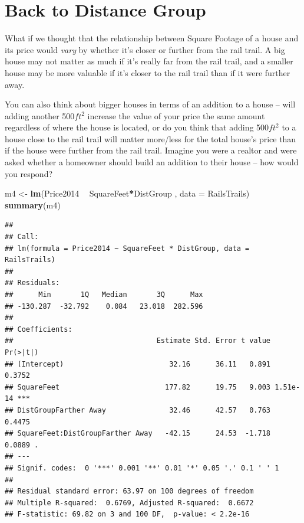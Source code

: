 \documentclass[]{article}
\newenvironment{Shaded}{\begin{snugshade}}{\end{snugshade}}
\newcommand{\DataTypeTok}[1]{\textcolor[rgb]{0.13,0.29,0.53}{#1}}
\newcommand{\KeywordTok}[1]{\textcolor[rgb]{0.13,0.29,0.53}{\textbf{#1}}}
\newcommand{\NormalTok}[1]{#1}
\newcommand{\OperatorTok}[1]{\textcolor[rgb]{0.81,0.36,0.00}{\textbf{#1}}}
\newcommand{\StringTok}[1]{\textcolor[rgb]{0.31,0.60,0.02}{#1}}
\begin{document}
\newpage

\hypertarget{back-to-distance-group}{%
\section{Back to Distance Group}\label{back-to-distance-group}}

What if we thought that the relationship between Square Footage of a
house and its price would \emph{vary} by whether it's closer or further
from the rail trail. A big house may not matter as much if it's really
far from the rail trail, and a smaller house may be more valuable if
it's closer to the rail trail than if it were further away.

You can also think about bigger houses in terms of an addition to a
house -- will adding another 500\(ft^2\) increase the value of your
price the same amount regardless of where the house is located, or do
you think that adding 500\(ft^2\) to a house close to the rail trail
will matter more/less for the total house's price than if the house were
further from the rail trail. Imagine you were a realtor and were asked
whether a homeowner should build an addition to their house -- how would
you respond?

\begin{Shaded}
\begin{Highlighting}[]
\NormalTok{m4 <-}\StringTok{ }\KeywordTok{lm}\NormalTok{(Price2014 }\OperatorTok{~}\StringTok{ }\NormalTok{SquareFeet}\OperatorTok{*}\NormalTok{DistGroup , }\DataTypeTok{data =}\NormalTok{ RailsTrails)}
\KeywordTok{summary}\NormalTok{(m4)}
\end{Highlighting}
\end{Shaded}

\begin{verbatim}
## 
## Call:
## lm(formula = Price2014 ~ SquareFeet * DistGroup, data = RailsTrails)
## 
## Residuals:
##      Min       1Q   Median       3Q      Max 
## -130.287  -32.792    0.084   23.018  282.596 
## 
## Coefficients:
##                                  Estimate Std. Error t value Pr(>|t|)    
## (Intercept)                         32.16      36.11   0.891   0.3752    
## SquareFeet                         177.82      19.75   9.003 1.51e-14 ***
## DistGroupFarther Away               32.46      42.57   0.763   0.4475    
## SquareFeet:DistGroupFarther Away   -42.15      24.53  -1.718   0.0889 .  
## ---
## Signif. codes:  0 '***' 0.001 '**' 0.01 '*' 0.05 '.' 0.1 ' ' 1
## 
## Residual standard error: 63.97 on 100 degrees of freedom
## Multiple R-squared:  0.6769, Adjusted R-squared:  0.6672 
## F-statistic: 69.82 on 3 and 100 DF,  p-value: < 2.2e-16
\end{verbatim}
\end{document}
